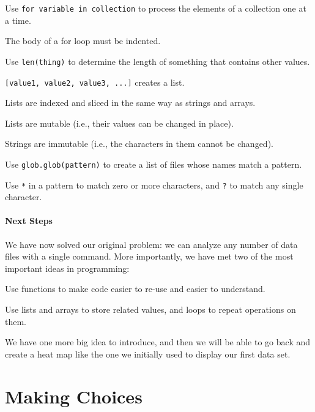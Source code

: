 \documentclass{book}
\begin{document}
\begin{keypoints}
\begin{swcitemize}
\item
  Use \texttt{for variable in collection} to process the elements of a
  collection one at a time.
\item
  The body of a for loop must be indented.
\item
  Use \texttt{len(thing)} to determine the length of something that
  contains other values.
\item
  \texttt{{[}value1, value2, value3, ...{]}} creates a list.
\item
  Lists are indexed and sliced in the same way as strings and arrays.
\item
  Lists are mutable (i.e., their values can be changed in place).
\item
  Strings are immutable (i.e., the characters in them cannot be
  changed).
\item
  Use \texttt{glob.glob(pattern)} to create a list of files whose names
  match a pattern.
\item
  Use \texttt{*} in a pattern to match zero or more characters, and
  \texttt{?} to match any single character.
\end{swcitemize}
\end{keypoints}

\mbox{}\paragraph{Next Steps}

We have now solved our original problem: we can analyze any number of
data files with a single command. More importantly, we have met two of
the most important ideas in programming:

\begin{swcenumerate}
\item
  Use functions to make code easier to re-use and easier to understand.
\item
  Use lists and arrays to store related values, and loops to repeat
  operations on them.
\end{swcenumerate}

We have one more big idea to introduce, and then we will be able to go
back and create a heat map like the one we initially used to display our
first data set.

\section{Making Choices}
\end{document}
